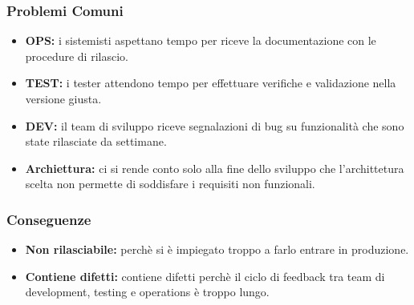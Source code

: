 \subsubsection{Problemi Comuni}
\begin{itemize}
    \item \textbf{OPS:} i sistemisti aspettano tempo per riceve la documentazione con le procedure di rilascio.
    \item \textbf{TEST:} i tester attendono tempo per effettuare verifiche e validazione nella versione giusta.
    \item \textbf{DEV:} il team di sviluppo riceve segnalazioni di bug su funzionalità che sono state rilasciate da settimane.
    \item \textbf{Archiettura:} ci si rende conto solo alla fine dello sviluppo che l’archittetura scelta non permette di soddisfare i requisiti non funzionali.
\end{itemize}

\subsubsection{Conseguenze}
\begin{itemize}
    \item \textbf{Non rilasciabile:} perchè si è impiegato troppo a farlo entrare in produzione.
    \item \textbf{Contiene difetti:} contiene difetti perchè il ciclo di feedback tra team di development, testing e operations è troppo lungo.
\end{itemize}

